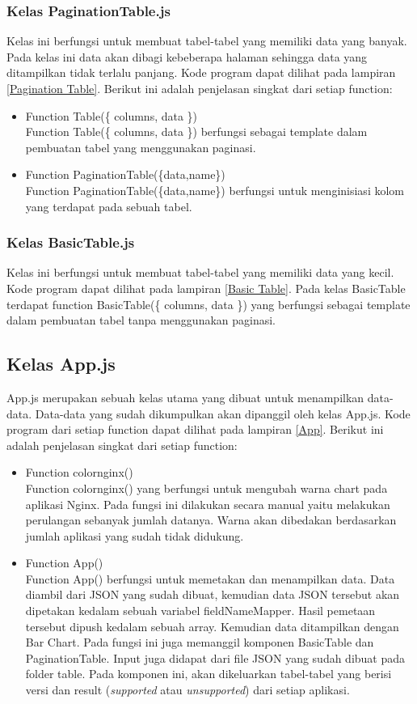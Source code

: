 \subsubsection{Kelas PaginationTable.js}
Kelas ini berfungsi untuk membuat tabel-tabel yang memiliki data yang banyak. Pada kelas ini data akan dibagi kebeberapa halaman sehingga data yang ditampilkan tidak terlalu panjang. Kode program dapat dilihat pada lampiran \ref{Pagination Table}. Berikut ini adalah penjelasan singkat dari setiap function:
\begin{itemize}
	\item Function Table(\{ columns, data \})\\
	Function Table(\{ columns, data \}) berfungsi sebagai template dalam pembuatan tabel yang menggunakan paginasi.
	\item Function PaginationTable(\{data,name\})\\
	Function PaginationTable(\{data,name\}) berfungsi untuk menginisiasi kolom yang terdapat pada sebuah tabel.
\end{itemize}
\subsubsection{Kelas BasicTable.js}
Kelas ini berfungsi untuk membuat tabel-tabel yang memiliki data yang kecil. Kode program dapat dilihat pada lampiran \ref{Basic Table}. Pada kelas BasicTable terdapat function BasicTable(\{ columns, data \}) yang berfungsi sebagai template dalam pembuatan tabel tanpa menggunakan paginasi.


\subsection{Kelas App.js}
App.js merupakan sebuah kelas utama yang dibuat untuk menampilkan data-data. Data-data yang sudah dikumpulkan akan dipanggil oleh kelas App.js. Kode program dari setiap function dapat dilihat pada lampiran \ref{App}. Berikut ini adalah penjelasan singkat dari setiap function: 
\begin{itemize}
	\item Function colornginx()\\
	Function colornginx() yang berfungsi untuk mengubah warna chart pada aplikasi Nginx. Pada fungsi ini dilakukan secara manual yaitu melakukan perulangan sebanyak jumlah datanya. Warna akan dibedakan berdasarkan jumlah aplikasi yang sudah tidak didukung.
	\item Function App()\\
	Function App() berfungsi untuk memetakan dan menampilkan data. Data diambil dari JSON yang sudah dibuat, kemudian data JSON tersebut akan dipetakan kedalam sebuah variabel fieldNameMapper. Hasil pemetaan tersebut dipush kedalam sebuah array. Kemudian data ditampilkan dengan Bar Chart. Pada fungsi ini juga memanggil komponen BasicTable  dan PaginationTable. Input juga didapat dari file JSON yang sudah dibuat pada folder table. Pada komponen ini, akan dikeluarkan tabel-tabel yang berisi versi dan result (\textit{supported} atau \textit{unsupported}) dari setiap aplikasi. 
\end{itemize}



